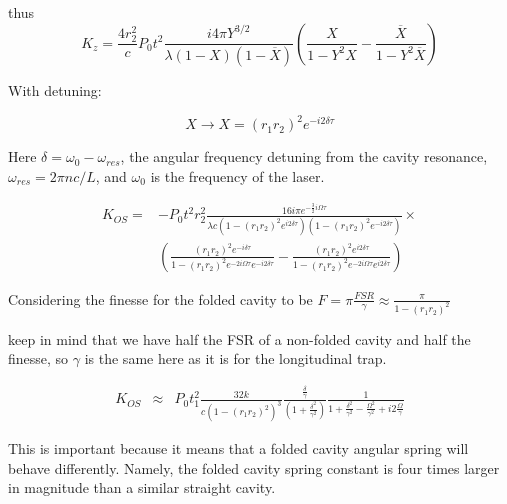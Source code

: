 thus 
\begin{equation}
K_z=\frac{4r_2^2}{c} P_0 t^2 \frac{i 4\pi Y^{3/2}}{\lambda(1-X)(1-\overline{X})}\left(\frac{X}{1-Y^2X}-\frac{\overline{X}}{1-Y^2\overline{X}}\right)
\label{eq:Kz}
\end{equation}

With detuning:

\begin{equation}
X \rightarrow X=(r_1r_2)^2 e^{-i2\delta\tau}
\label{e:Xdet}
\end{equation}

Here $\delta = \omega_0-\omega_{res}$, the angular frequency detuning from the cavity resonance, $\omega_{res} = 2\pi n c/L$, and $\omega_0$ is the frequency of the laser.

\begin{eqnarray}
K_{OS}=&-P_0 t^2 r_2^2 \frac{16i\pi e^{-\frac{3}{2}i\Omega\tau}}{\lambda c(1-(r_1r_2)^2e^{i2\delta\tau})(1-(r_1r_2)^2e^{-i2\delta\tau})}\times\nonumber\\
 & \left( \frac{(r_1r_2)^2e^{-i\delta \tau}}{1-(r_1r_2)^2e^{-2i\Omega\tau} e^{-i2\delta\tau}}
 -\frac{(r_1r_2)^2e^{i2\delta\tau}}{1-(r_1r_2)^2e^{-2i\Omega\tau}e^{i2\delta\tau}} \right) 
\end{eqnarray}

Considering the finesse for the folded cavity to be $F = \pi\frac{FSR}{\gamma} \approx \frac{\pi}{1-(r_1r_2)^2} $

keep in mind that we have half the FSR of a non-folded cavity and half the finesse, so $\gamma$ is the same here as it is for the longitudinal trap.

\begin{eqnarray}
\label{eq:KOSfold}
K_{OS} & {\approx} & P_0 t_1^2 \frac{32k}{c(1-(r_1r_2)^2)^3}\frac{ \frac{\delta}{\gamma}}{(1+\frac{\delta^2}{\gamma^2})} 
\frac{1}{1+\frac{\delta^2}{\gamma^2}-\frac{\Omega^2}{\gamma^2}+i2\frac{\Omega}{\gamma} }
\end{eqnarray}

This is important because it means that a folded cavity angular spring will behave differently. Namely, the folded cavity spring constant is four times larger in magnitude than a similar straight cavity.

